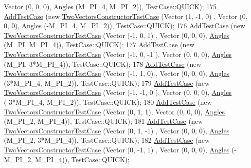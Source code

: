 \begin{DoxyCode}
           Vector (0, 0, 0), \hyperlink{structns3_1_1Angles}{Angles} (M\_PI\_4, M\_PI\_2)), TestCase::QUICK);
175   \hyperlink{classns3_1_1TestCase_a3718088e3eefd5d6454569d2e0ddd835}{AddTestCase} (\textcolor{keyword}{new} \hyperlink{classTwoVectorsConstructorTestCase}{TwoVectorsConstructorTestCase} (Vector (1, -1, 0)
      ,    Vector (0, 0, 0), \hyperlink{structns3_1_1Angles}{Angles} (-M\_PI\_4, M\_PI\_2)), TestCase::QUICK);
176   \hyperlink{classns3_1_1TestCase_a3718088e3eefd5d6454569d2e0ddd835}{AddTestCase} (\textcolor{keyword}{new} \hyperlink{classTwoVectorsConstructorTestCase}{TwoVectorsConstructorTestCase} (Vector (-1, 0, 1)
      ,    Vector (0, 0, 0), \hyperlink{structns3_1_1Angles}{Angles} (M\_PI, M\_PI\_4)), TestCase::QUICK);
177   \hyperlink{classns3_1_1TestCase_a3718088e3eefd5d6454569d2e0ddd835}{AddTestCase} (\textcolor{keyword}{new} \hyperlink{classTwoVectorsConstructorTestCase}{TwoVectorsConstructorTestCase} (Vector (-1, 0, -1
      ),   Vector (0, 0, 0), \hyperlink{structns3_1_1Angles}{Angles} (M\_PI, 3*M\_PI\_4)), TestCase::QUICK);
178   \hyperlink{classns3_1_1TestCase_a3718088e3eefd5d6454569d2e0ddd835}{AddTestCase} (\textcolor{keyword}{new} \hyperlink{classTwoVectorsConstructorTestCase}{TwoVectorsConstructorTestCase} (Vector (-1, 1, 0)
      ,    Vector (0, 0, 0), \hyperlink{structns3_1_1Angles}{Angles} (3*M\_PI\_4, M\_PI\_2)), TestCase::QUICK);
179   \hyperlink{classns3_1_1TestCase_a3718088e3eefd5d6454569d2e0ddd835}{AddTestCase} (\textcolor{keyword}{new} \hyperlink{classTwoVectorsConstructorTestCase}{TwoVectorsConstructorTestCase} (Vector (-1, -1, 0
      ),   Vector (0, 0, 0), \hyperlink{structns3_1_1Angles}{Angles} (-3*M\_PI\_4, M\_PI\_2)), TestCase::QUICK);
180   \hyperlink{classns3_1_1TestCase_a3718088e3eefd5d6454569d2e0ddd835}{AddTestCase} (\textcolor{keyword}{new} \hyperlink{classTwoVectorsConstructorTestCase}{TwoVectorsConstructorTestCase} (Vector (0, 1, 1),
           Vector (0, 0, 0), \hyperlink{structns3_1_1Angles}{Angles} (M\_PI\_2, M\_PI\_4)), TestCase::QUICK);
181   \hyperlink{classns3_1_1TestCase_a3718088e3eefd5d6454569d2e0ddd835}{AddTestCase} (\textcolor{keyword}{new} \hyperlink{classTwoVectorsConstructorTestCase}{TwoVectorsConstructorTestCase} (Vector (0, 1, -1)
      ,    Vector (0, 0, 0), \hyperlink{structns3_1_1Angles}{Angles} (M\_PI\_2, 3*M\_PI\_4)), TestCase::QUICK);
182   \hyperlink{classns3_1_1TestCase_a3718088e3eefd5d6454569d2e0ddd835}{AddTestCase} (\textcolor{keyword}{new} \hyperlink{classTwoVectorsConstructorTestCase}{TwoVectorsConstructorTestCase} (Vector (0, -1, 1)
      ,    Vector (0, 0, 0), \hyperlink{structns3_1_1Angles}{Angles} (-M\_PI\_2, M\_PI\_4)), TestCase::QUICK);

\end{DoxyCode}
